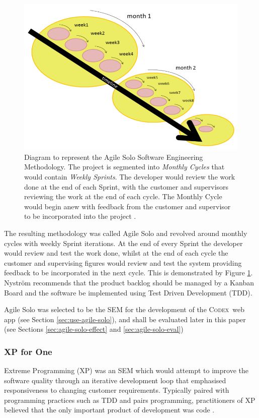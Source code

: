 \documentclass[final]{cmpreport}
\newcommand{\Codex}{\textsc{Codex}}
\begin{document}
			\begin{figure}[H]
				\centering
				\includegraphics[width=0.8\linewidth]{agile-solo.png}
				\caption[Agile Solo Diagram]{Diagram to represent the Agile Solo Software Engineering Methodology. The project is segmented into \emph{Monthly Cycles} that would contain \emph{Weekly Sprints}. The developer would review the work done at the end of each Sprint, with the customer and supervisors reviewing the work at the end of each cycle. The Monthly Cycle would begin anew with feedback from the customer and supervisor to be incorporated into the project \citep{AgileSolo}.} \label{fig:agile-solo}
			\end{figure}
			
			The resulting methodology was called Agile Solo and revolved around monthly cycles with weekly Sprint iterations. At the end of every Sprint the developer would review and test the work done, whilst at the end of each cycle the customer and supervising figures would review and test the system providing feedback to be incorporated in the next cycle. This is demonstrated by Figure \ref{fig:agile-solo}. Nystr{\"o}m recommends that the product backlog should be managed by a Kanban Board and the software be implemented using Test Driven Development (TDD). 
			
			Agile Solo was selected to be the SEM for the development of the \Codex \ web app (see Section \ref{sec:use-agile-solo}), and shall be evaluated later in this paper (see Sections \ref{sec:agile-solo-effect} and \ref{sec:agile-solo-eval})
			
			\subsubsection{XP for One} \label{sec:xp-for-one}
			Extreme Programming (XP) was an SEM which would attempt to improve the software quality through an iterative development loop that emphasised responsiveness to changing customer requirements. Typically paired with programming practices such as TDD and pairs programming, practitioners of XP believed that the only important product of development was code \citep{XP}.  
			
\end{document}
